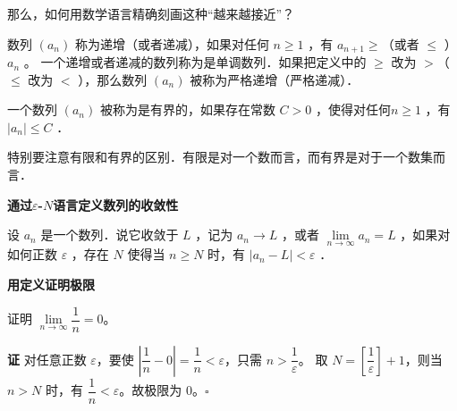 \documentclass[fontset=fandol]{ctexart}
\newenvironment{custom}[1]{\par\noindent\textbf{#1}\quad}{\par\vspace{0.8em}}
\begin{document}
那么，如何用数学语言精确刻画这种“越来越接近”？

\begin{definition}[数列单调性]
	数列 $\left(a_n\right)$ 称为递增（或者递减），如果对任何 $n \geqslant 1$ ，有 $a_{n+1} \geqslant$（或者 $\leqslant$ ）$a_n$ 。
	一个递增或者递减的数列称为是单调数列．如果把定义中的 $\geqslant$ 改为 $>$（ $\leqslant$ 改为 $<$ ），那么数列 $\left(a_n\right)$ 被称为严格递增（严格递减）．
\end{definition}

\begin{definition}[数列有界性]
	 一个数列 $\left(a_n\right)$ 被称为是有界的，如果存在常数 $C>0$ ，使得对任何$n \geqslant 1$ ，有 $\left|a_n\right| \leqslant C$ ．
\end{definition}



特别要注意有限和有界的区别．有限是对一个数而言，而有界是对于一个数集而言．


\textbf{通过\texorpdfstring{\(\varepsilon\)-\(N\)语言定义数列的收敛性}{epsilon-N 定义}}




\begin{definition}[数列极限]
设 $a_n$ 是一个数列．说它收敛于 $L$ ，记为 $a_n \rightarrow L$ ，或者 $\lim \limits_{n \to \infty} a_n=L$ ，如果对如何正数 $\varepsilon$ ，存在 $N$ 使得当 $n \geqslant N$ 时，有 $\left|a_n-L\right|<\varepsilon$ ．
\end{definition}

\textbf{用定义证明极限}

\begin{example}
证明 \(\lim\limits_{n\to\infty} \dfrac{1}{n} = 0\)。
\end{example}
\begin{custom}{证}
对任意正数 \(\varepsilon \)，要使 \(\left|\dfrac{1}{n} - 0\right| = \dfrac{1}{n} < \varepsilon\)，只需 \(n > \dfrac{1}{\varepsilon}\)。
取 \(N = \left[ \dfrac{1}{\varepsilon} \right] + 1\)，则当 \(n > N\) 时，有 \(\dfrac{1}{n} < \varepsilon\)。故极限为 0。\(\square\)
\end{custom}
\end{document}
